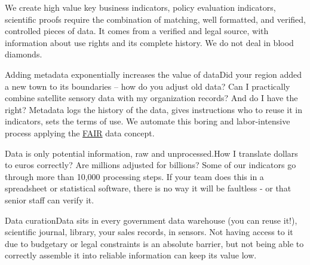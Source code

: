 \documentclass[
  a4paper,
  openany, a4paper, oneside]{book}
\begin{document}
We create high value key business indicators, policy evaluation indicators, scientific proofs require the combination of matching, well formatted, and verified, controlled pieces of data. It comes from a verified and legal source, with information about use rights and its complete history. We do not deal in blood diamonds.

Adding metadata exponentially increases the value of dataDid your region added a new town to its boundaries -- how do you adjust old data? Can I practically combine satellite sensory data with my organization records? And do I have the right? Metadata logs the history of the data, gives instructions who to reuse it in indicators, sets the terms of use. We automate this boring and labor-intensive process applying the \href{https://contributors.dataobservatory.eu/FAIR-data.html\#FAIR}{FAIR} data concept.

Data is only potential information, raw and unprocessed.How I translate dollars to euros correctly? Are millions adjusted for billions? Some of our indicators go through more than 10,000 processing steps. If your team does this in a spreadsheet or statistical software, there is no way it will be faultless - or that senior staff can verify it.

Data curationData sits in every government data warehouse (you can reuse it!), scientific journal, library, your sales records, in sensors. Not having access to it due to budgetary or legal constraints is an absolute barrier, but not being able to correctly assemble it into reliable information can keep its value low.
\end{document}
